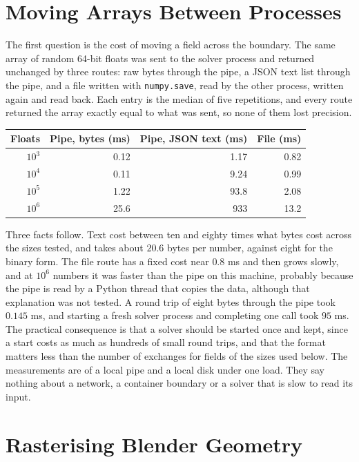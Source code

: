 \section{Moving Arrays Between Processes}

The first question is the cost of moving a field across the boundary. The same array of random 64-bit floats was sent to the solver process and returned unchanged by three routes: raw bytes through the pipe, a JSON text list through the pipe, and a file written with \texttt{numpy.save}, read by the other process, written again and read back. Each entry is the median of five repetitions, and every route returned the array exactly equal to what was sent, so none of them lost precision.

\begin{center}
\small
\begin{tabular}{rrrr}
\toprule
Floats & Pipe, bytes (ms) & Pipe, JSON text (ms) & File (ms)\\
\midrule
$10^3$ & 0.12 & 1.17 & 0.82\\
$10^4$ & 0.11 & 9.24 & 0.99\\
$10^5$ & 1.22 & 93.8 & 2.08\\
$10^6$ & 25.6 & 933 & 13.2\\
\bottomrule
\end{tabular}
\end{center}

Three facts follow. Text cost between ten and eighty times what bytes cost across the sizes tested, and takes about $20.6$ bytes per number, against eight for the binary form. The file route has a fixed cost near $0.8$ ms and then grows slowly, and at $10^6$ numbers it was faster than the pipe on this machine, probably because the pipe is read by a Python thread that copies the data, although that explanation was not tested. A round trip of eight bytes through the pipe took $0.145$ ms, and starting a fresh solver process and completing one call took $95$ ms. The practical consequence is that a solver should be started once and kept, since a start costs as much as hundreds of small round trips, and that the format matters less than the number of exchanges for fields of the sizes used below. The measurements are of a local pipe and a local disk under one load. They say nothing about a network, a container boundary or a solver that is slow to read its input.

\section{Rasterising Blender Geometry}

